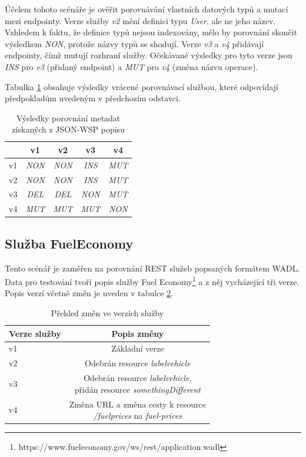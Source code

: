 \documentclass[czech,DP]{thesiskiv}
\begin{document}
Účelem tohoto scénáře je ověřit porovnávání vlastních datových typů a mutací mezi endpointy. Verze služby \textit{v2} mění definici typu \textit{User}, ale ne jeho název. Vzhledem k faktu, že definice typů nejsou indexovány, mělo by porovnání skončit výsledkem \textit{NON}, protože názvy typů se shodují. Verze \textit{v3} a \textit{v4} přidávají endpointy, čímž mutují rozhraní služby. Očekávané výsledky pro tyto verze jsou \textit{INS} pro \textit{v3} (přidaný endpoint) a \textit{MUT} pro \textit{v4} (změna názvu operace).

Tabulka \ref{tab:jsonwsp-cmp-res} obsahuje výsledky vrácené porovnávací službou, které odpovídají předpokladům uvedeným v předchozím odstavci.

\begin{table}[h]
	\centering
	\begin{tabular}{|l||c|c|c|c|}
		\hline
		& v1 & v2 & v3 & v4 \\
		\hline
		\hline
		v1 & \textit{NON} & \textit{NON} & \textit{INS} & \textit{MUT} \\
		\hline
		v2 & \textit{NON} & \textit{NON} & \textit{INS} & \textit{MUT} \\
		\hline
		v3 & \textit{DEL} & \textit{DEL} & \textit{NON} & \textit{MUT} \\
		\hline
		v4 & \textit{MUT} & \textit{MUT} & \textit{MUT} & \textit{NON} \\
		\hline
	\end{tabular}
	\caption{Výsledky porovnání metadat získaných z JSON-WSP popisu}
	\label{tab:jsonwsp-cmp-res}
\end{table}


\subsection{Služba FuelEconomy}

Tento scénář je zaměřen na porovnání REST služeb popsaných formátem WADL. Data pro testování tvoří popis služby Fuel Economy\footnote{https://www.fueleconomy.gov/ws/rest/application.wadl} a z něj vycházející tři verze. Popis verzí včetně změn je uveden v tabulce \ref{tab:wadl-diffs}.

\begin{table}[h]
	\centering
	\begin{tabular}{|l|c|}
		\hline
		Verze služby & Popis změny \\
		\hline
		\hline
		v1 & Základní verze \\
		\hline
		v2 & Odebrán resource \textit{labelvehicle} \\
		\hline
		v3 & \makecell{Odebrán resource \textit{labelvehicle}, \\ přidán resource \textit{somethingDifferent}} \\
		\hline
		v4 & \makecell{Změna URL a změna cesty k resource \\ \textit{/fuelprices} na \textit{fuel-prices}}  \\
		\hline
	\end{tabular}
	\caption{Přehled změn ve verzích služby}
	\label{tab:wadl-diffs}
\end{table}
\end{document}
